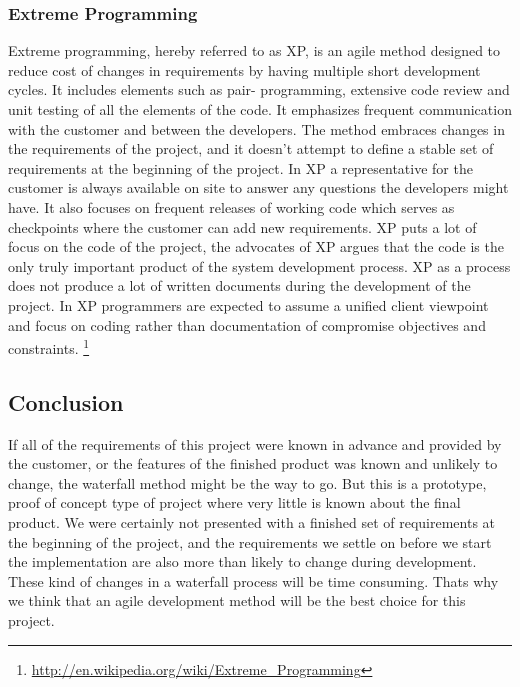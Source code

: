 \subsubsection{Extreme Programming}
Extreme programming, hereby referred to as XP, is an agile method designed to reduce cost of changes in requirements by having multiple short development cycles. It includes elements such as pair- programming, extensive code review and unit testing of all the elements of the code. It emphasizes frequent communication with the customer and between the developers. The method embraces changes in the requirements of the project, and it doesn't attempt to define a stable set of requirements at the beginning of the project. In XP a representative for the customer is always available on site to answer any questions the developers might have. It also focuses on frequent releases of working code which serves as checkpoints where the customer can add new requirements. XP puts a lot of focus on the code of the project, the advocates of XP argues that the code is the only truly important product of the system development process. XP as a process does not produce a lot of written documents during the development of the project. In XP programmers are expected to assume a unified client viewpoint and focus on coding rather than documentation of compromise objectives and constraints.
\footnote{\url{http://en.wikipedia.org/wiki/Extreme_Programming}}

\subsection{Conclusion}
If all of the requirements of this project were known in advance and provided by the customer, or the features of the finished product was known and unlikely to change, the waterfall method might be the way to go. But this is a prototype, proof of concept type of project where very little is known about the final product. We were certainly not presented with a finished set of requirements at the beginning of the project, and the requirements we settle on before we start the implementation are also more than likely to change during development. These kind of changes in a waterfall process will be time consuming. Thats why we think that an agile development method will be the best choice for this project.

